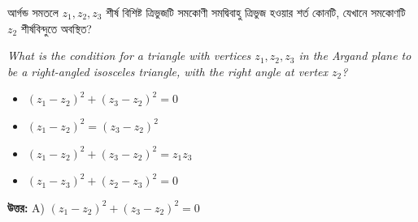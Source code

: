\documentclass[12pt, a4paper]{article}
\begin{document}
\begin{tcolorbox}[questionbox={প্রশ্ন (Question) 8}]
    \noindent
    আর্গন্ড সমতলে $z_1, z_2, z_3$ শীর্ষ বিশিষ্ট ত্রিভুজটি সমকোণী সমদ্বিবাহু ত্রিভুজ হওয়ার শর্ত কোনটি, যেখানে সমকোণটি $z_2$ শীর্ষবিন্দুতে অবস্থিত?
    
    \vspace{0.8em}
    \begin{english}
    \noindent\textit{\color{darkgray}
    What is the condition for a triangle with vertices $z_1, z_2, z_3$ in the Argand plane to be a right-angled isosceles triangle, with the right angle at vertex $z_2$?
    }
    \end{english}
\end{tcolorbox}

\begin{itemize}[label={}, leftmargin=1cm, itemsep=0.5em]
    \item[\textbf{A)}] $(z_1 - z_2)^2 + (z_3 - z_2)^2 = 0$
    \item[\textbf{B)}] $(z_1 - z_2)^2 = (z_3 - z_2)^2$
    \item[\textbf{C)}] $(z_1 - z_2)^2 + (z_3 - z_2)^2 = z_1 z_3$
    \item[\textbf{D)}] $(z_1 - z_3)^2 + (z_2 - z_3)^2 = 0$
\end{itemize}

\vspace{0.5em}
\begin{tcolorbox}[answerbox]
    \textbf{\color{success} উত্তর:} A) $(z_1 - z_2)^2 + (z_3 - z_2)^2 = 0$
\end{tcolorbox}
\vspace{1em}
\end{document}
